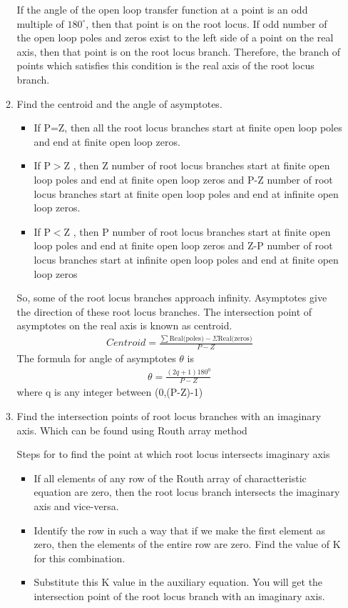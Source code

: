 \begin{enumerate}[label=\thesection.\arabic*.,ref=\thesection.\theenumi]
\begin{enumerate}
 If the angle of the open loop transfer function at a point is an odd multiple of $180^{\circ}$, then that point is on the root locus. If odd number of the open loop poles and zeros exist to the left side of a point on the real axis, then that point is on the root locus branch. Therefore, the branch of points which satisfies this condition is the real axis of the root locus branch.
	\item Find the centroid and the angle of asymptotes.
	\begin{itemize}
	\item If P=Z, then all the root locus branches start at finite open loop poles and end at finite open loop zeros.
	\item If P$>$Z , then Z number of root locus branches start at finite open loop poles and end at finite open loop zeros and P-Z number of root locus branches start at finite open loop poles and end at infinite open loop zeros.
	\item If P$<$Z , then P number of root locus branches start at finite open loop poles and end at finite open loop zeros and Z-P number of root locus branches start at infinite open loop poles and end at finite open loop zeros

	\end{itemize}
So, some of the root locus branches approach infinity. Asymptotes give the direction of these root locus branches. The intersection point of asymptotes on the real axis is known as centroid.
\begin{align}
Centroid =\frac{\sum \text {Real(poles)}-\Sigma \text {Real(zeros)}}{P-Z}
\end{align}
The formula for angle of asymptotes $\theta$ is
\begin{align}
\theta=\frac{(2 q+1) 180^{0}}{P-Z}
\end{align}
where q is any integer between (0,(P-Z)-1)


	\item Find the intersection points of root locus branches with an imaginary axis. Which can be found using Routh array method

Steps for to find the point at which root locus intersects imaginary axis
\begin{itemize}
\item If all elements of any row of the Routh array of charactteristic equation are zero, then the root locus branch intersects the imaginary axis and vice-versa.
\item Identify the row in such a way that if we make the first element as zero, then the elements of the entire row are zero. Find the value of K for this combination.
\item Substitute this K value in the auxiliary equation. You will get the intersection point of the root locus branch with an imaginary axis.



\end{itemize}
\end{enumerate}
\end{enumerate}

